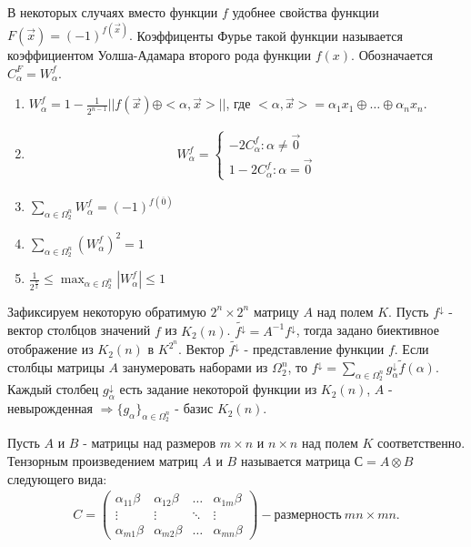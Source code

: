 В некоторых случаях вместо функции $f$ удобнее свойства функции $F(\vec{x}) = (-1)^{f(\vec{x})}.$ Коэффиценты Фурье такой функции называется коэффициентом Уолша-Адамара второго рода функции $f(x)$. Обозначается $C_\alpha^F = W_\alpha^f$.\\

\prop
\begin{enumerate}
    \item $W_\alpha^f = 1 - \frac{1}{2^{n-1}} ||f(\vec{x}) \oplus  <\alpha,\vec{x}>||$, где $<\alpha, \vec{x}> = \alpha_1 x_1 \oplus \dots \oplus \alpha_n x_n$.

    \item \begin{align*}
            W_\alpha^f =
                \begin{cases}
                    -2 C_\alpha^f  : \alpha \neq \vec{0}\\
                    1-2 C_\alpha^f : \alpha = \vec{0}
                \end{cases}
            \end{align*}
    
    \item $\sum_{\alpha \in \Omega_2^n} W_\alpha^f = (-1)^{f(\overline{0})} $

    \item $\sum_{\alpha \in \Omega_2^n} (W_\alpha^f)^2 = 1$

    \item $\frac{1}{2^{\frac{n}{2}}} \leq \max_{\alpha \in \Omega_2^n} |W_\alpha^f| \leq 1$
\end{enumerate}

Зафиксируем некоторую обратимую $2^n \times 2^n$ матрицу $A$ над полем $K$. Пусть $f^{\downarrow}$ - вектор столбцов значений $f$ из $K_2(n)$.
$\widetilde{f^\downarrow} = A^{-1} f^\downarrow$, тогда задано биективное отображение из $K_2(n)$ в $K^{2^n}$.
Вектор $\widetilde{f^\downarrow}$ - представление функции $f$.
Если столбцы матрицы $A$ занумеровать наборами из $\Omega_2^n$, то $f^\downarrow = \sum_{\alpha \in \Omega_2^n} g_\alpha^\downarrow \widetilde{f}(\alpha)$.
Каждый столбец $g_\alpha^\downarrow$ есть задание некоторой функции из $K_2(n)$, $A$ - невырожденная $\Rightarrow \{ g_\alpha \}_{\alpha \in \Omega_2^n}$ - базис $K_2(n)$.

\opri Пусть $A$ и $B$ - матрицы над размеров $m \times n$ и $n \times n$ над полем $K$ соответственно. Тензорным произведением матриц $A$ и $B$ называется матрица $С = A \otimes B$ следующего вида:
\begin{align*}
    C =
    \begin{pmatrix}
        \alpha_{11}\beta & \alpha_{12}\beta & \dots & \alpha_{1m}\beta \\
        \vdots & \vdots & \ddots  & \vdots \\
        \alpha_{m1}\beta & \alpha_{m2}\beta & \dots & \alpha_{mn}\beta
    \end{pmatrix}
    - \text{размерность}\  mn \times mn.
\end{align*}

